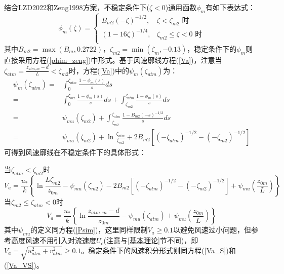 结合LZD2022和Zeng1998方案，不稳定条件下($\zeta<0$)通用函数$\phi_{m}$有如下表达式：
\begin{equation}
\phi_{m}(\zeta)= \begin{cases}
   B_{m2}(-\zeta)^{-1/2}, & \zeta<\zeta_{m2} \text { 时} \\
   (1-16 \zeta)^{-1/4}, & \zeta_{m2} \leq \zeta<0 \text { 时} \\
\end{cases}
\end{equation}
其中$B_{m2}=\max(B_{m},0.2722)$，$\zeta_{m2}=\min(\zeta_{m},-0.13)$，稳定条件下的$\phi_{m}$则直接采用方程(\ref{phim_zeng})中形式。基于风速廓线方程(\ref{Va})，注意当
$\zeta_{atm}=\frac{z_{atm,m}-d}{L}<\zeta_{m2}$时，方程(\ref{Va})中的$\psi_{m}\left(\zeta_{atm}\right)$为：
\begin{align}
\psi_{m}\left(\zeta_{atm}\right) =& \int_{0}^{\zeta_{atm}} \frac{1-\phi_{m}(s)}{s} d s  \nonumber \\
 =& \int_{0}^{\zeta_{m2}} \frac{1-\phi_{m}(s)}{s} d s + \int_{\zeta_{m2}}^{\zeta_{atm}} \frac{1-\phi_{m}(s)}{s} d s  \nonumber \\
 =& \psi_{mu}(\zeta_{m2}) + \int_{\zeta_{m2}}^{\zeta_{atm}} \frac{1-B_{m2}(-s)^{-1/2}}{s} d s  \nonumber \\
 =& \psi_{mu}(\zeta_{m2}) + \ln \frac{\zeta_{atm}}{\zeta_{m2}} + 2B_{m2}\left[(-\zeta_{atm})^{-1/2}-(-\zeta_{m2})^{-1/2}\right]
\end{align}
可得到风速廓线在不稳定条件下的具体形式：

\noindent 当$\zeta_{atm}<\zeta_{m2}$时
\begin{equation}\label{Va_U_LZD1}
V_{a}=\frac{u_{*}}{k}\left\{\ln \frac{L\zeta_{m2}}{z_{0 m}}-\psi_{mu}\left(\zeta_{m2}\right)-2B_{m2}\left[(-\zeta_{atm})^{-1/2}-(-\zeta_{m2})^{-1/2}\right]+\psi_{mu}\left(\frac{z_{0 m}}{L}\right)\right\}
\end{equation}
\noindent 当$ \zeta_{m2} \leq \zeta_{atm}<0$时
\begin{equation}\label{Va_U_LZD2}
V_{a}=\frac{u_{*}}{k}\left\{\ln \frac{z_{atm, m}-d}{z_{0 m}}-\psi_{mu}\left(\zeta_{atm}\right)+\psi_{mu}\left(\frac{z_{0 m}}{L}\right)\right\}
\end{equation}
其中$\psi_{mu}$的定义同方程(\ref{Psim})，这里同样限制$V_a\geq0.1$以避免风速过小问题，但参考高度风速不用引入对流速度$U_c$(注意与\ref{基本理论}节不同)，即
$V_{a}=\sqrt{u_{atm}^{2}+v_{atm}^{2}} \geq 0.1$。稳定条件下的风速积分形式则同方程(\ref{Va_S})和(\ref{Va_VS})。

